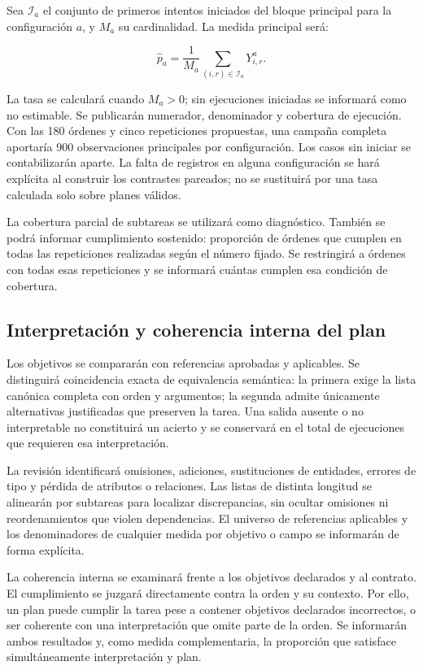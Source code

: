 Sea $\mathcal{I}_a$ el conjunto de primeros intentos iniciados del bloque
principal para la configuración $a$, y $M_a$ su cardinalidad. La medida
principal será:

\begin{equation}
\widehat{p}_a=\frac{1}{M_a}
\sum_{(i,r)\in\mathcal{I}_a}Y_{i,r}^{a}.
\label{eq:cumplimiento_principal_cap6}
\end{equation}

La tasa se calculará cuando $M_a>0$; sin ejecuciones iniciadas se
informará como no estimable. Se publicarán numerador, denominador y
cobertura de ejecución. Con las
180 órdenes y cinco repeticiones propuestas, una campaña completa
aportaría 900 observaciones principales por configuración. Los casos
sin iniciar se contabilizarán aparte. La falta de registros en alguna
configuración se hará explícita al construir los contrastes pareados;
no se sustituirá por una tasa calculada solo sobre planes válidos.

La cobertura parcial de subtareas se utilizará como diagnóstico. También
se podrá informar cumplimiento sostenido: proporción de órdenes que
cumplen en todas las repeticiones realizadas según el número fijado.
Se restringirá a órdenes con todas esas repeticiones y se informará
cuántas cumplen esa condición de cobertura.

\subsection{Interpretación y coherencia interna del plan}
\label{sec:semantica_cap6}

Los objetivos se compararán con referencias aprobadas y aplicables.
Se distinguirá coincidencia exacta de equivalencia semántica: la primera
exige la lista canónica completa con orden y argumentos; la segunda
admite únicamente alternativas justificadas que preserven la tarea.
Una salida ausente o no interpretable no constituirá un acierto y se
conservará en el total de ejecuciones que requieren esa interpretación.

La revisión identificará omisiones, adiciones, sustituciones de entidades,
errores de tipo y pérdida de atributos o relaciones. Las listas de distinta
longitud se alinearán por subtareas para localizar discrepancias, sin
ocultar omisiones ni reordenamientos que violen dependencias.
El universo de referencias aplicables y los denominadores de cualquier
medida por objetivo o campo se informarán de forma explícita.

La coherencia interna se examinará frente a los objetivos declarados y
al contrato. El cumplimiento se juzgará directamente contra la orden
y su contexto. Por ello, un plan puede cumplir la tarea pese a contener
objetivos declarados incorrectos, o ser coherente con una interpretación
que omite parte de la orden. Se informarán ambos resultados y, como
medida complementaria, la proporción que satisface simultáneamente
interpretación y plan.

